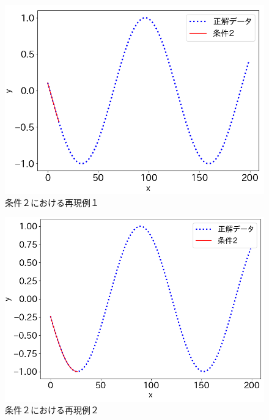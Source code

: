\begin{figure}[hp]
  \begin{center}
    \includegraphics[width=12cm]{./fig/append3}
    \caption{条件２における再現例１}
    \label{fig:append3}
  \end{center}
\end{figure}

\begin{figure}[htp]
  \begin{center}
    \includegraphics[width=12cm]{./fig/append4}
    \caption{条件２における再現例２}
    \label{fig:append4}
  \end{center}
\end{figure}

